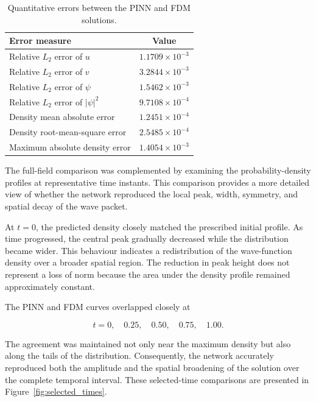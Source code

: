 \documentclass[11pt]{article}
\begin{document}
\begin{table}[htbp]
	\centering
	\caption{Quantitative errors between the PINN and FDM solutions.}
	\label{tab:accuracy_metrics}
	\begin{tabular}{lc}
		\hline
		\textbf{Error measure} & \textbf{Value} \\
		\hline
		Relative \(L_2\) error of \(u\)
		& \(1.1709\times10^{-3}\) \\
		
		Relative \(L_2\) error of \(v\)
		& \(3.2844\times10^{-3}\) \\
		
		Relative \(L_2\) error of \(\psi\)
		& \(1.5462\times10^{-3}\) \\
		
		Relative \(L_2\) error of \(|\psi|^2\)
		& \(9.7108\times10^{-4}\) \\
		
		Density mean absolute error
		& \(1.2451\times10^{-4}\) \\
		
		Density root-mean-square error
		& \(2.5485\times10^{-4}\) \\
		
		Maximum absolute density error
		& \(1.4054\times10^{-3}\) \\
		\hline
	\end{tabular}
	
\end{table}


The full-field comparison was complemented by examining the probability-density profiles at representative time instants. This comparison provides a more detailed view of whether the network reproduced the local peak, width, symmetry, and spatial decay of the wave packet.

At \(t=0\), the predicted density closely matched the prescribed initial profile. As time progressed, the central peak gradually decreased while the distribution became wider. This behaviour indicates a redistribution of the wave-function density over a broader spatial region. The reduction in peak height does not represent a loss of norm because the area under the density profile remained approximately constant.

The PINN and FDM curves overlapped closely at

\[
t=0,\quad 0.25,\quad 0.50,\quad 0.75,\quad 1.00.
\]

The agreement was maintained not only near the maximum density but also along the tails of the distribution. Consequently, the network accurately reproduced both the amplitude and the spatial broadening of the solution over the complete temporal interval. These selected-time comparisons are presented in Figure~\ref{fig:selected_times}.
\end{document}
